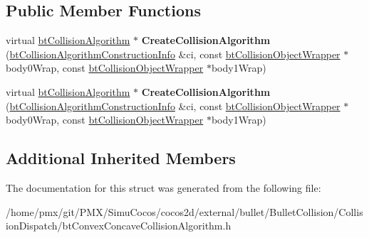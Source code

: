 \subsection*{Public Member Functions}
\begin{DoxyCompactItemize}
\item 
\mbox{\label{structbtConvexConcaveCollisionAlgorithm_1_1CreateFunc_a20a1e48c6c21b4f8cd07727c6615536b}} 
virtual \hyperlink{classbtCollisionAlgorithm}{bt\+Collision\+Algorithm} $\ast$ {\bfseries Create\+Collision\+Algorithm} (\hyperlink{structbtCollisionAlgorithmConstructionInfo}{bt\+Collision\+Algorithm\+Construction\+Info} \&ci, const \hyperlink{structbtCollisionObjectWrapper}{bt\+Collision\+Object\+Wrapper} $\ast$body0\+Wrap, const \hyperlink{structbtCollisionObjectWrapper}{bt\+Collision\+Object\+Wrapper} $\ast$body1\+Wrap)
\item 
\mbox{\label{structbtConvexConcaveCollisionAlgorithm_1_1CreateFunc_a20a1e48c6c21b4f8cd07727c6615536b}} 
virtual \hyperlink{classbtCollisionAlgorithm}{bt\+Collision\+Algorithm} $\ast$ {\bfseries Create\+Collision\+Algorithm} (\hyperlink{structbtCollisionAlgorithmConstructionInfo}{bt\+Collision\+Algorithm\+Construction\+Info} \&ci, const \hyperlink{structbtCollisionObjectWrapper}{bt\+Collision\+Object\+Wrapper} $\ast$body0\+Wrap, const \hyperlink{structbtCollisionObjectWrapper}{bt\+Collision\+Object\+Wrapper} $\ast$body1\+Wrap)
\end{DoxyCompactItemize}
\subsection*{Additional Inherited Members}


The documentation for this struct was generated from the following file\+:\begin{DoxyCompactItemize}
\item 
/home/pmx/git/\+P\+M\+X/\+Simu\+Cocos/cocos2d/external/bullet/\+Bullet\+Collision/\+Collision\+Dispatch/bt\+Convex\+Concave\+Collision\+Algorithm.\+h\end{DoxyCompactItemize}

